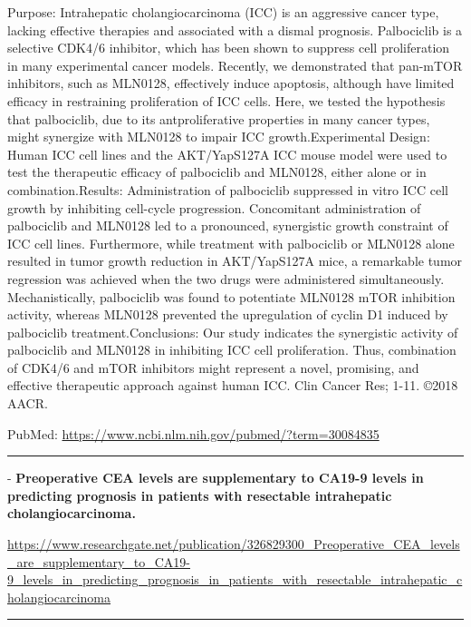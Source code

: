 \documentclass[]{article}
\begin{document}
Purpose: Intrahepatic cholangiocarcinoma (ICC) is an aggressive cancer
type, lacking effective therapies and associated with a dismal
prognosis. Palbociclib is a selective CDK4/6 inhibitor, which has been
shown to suppress cell proliferation in many experimental cancer models.
Recently, we demonstrated that pan-mTOR inhibitors, such as MLN0128,
effectively induce apoptosis, although have limited efficacy in
restraining proliferation of ICC cells. Here, we tested the hypothesis
that palbociclib, due to its antproliferative properties in many cancer
types, might synergize with MLN0128 to impair ICC growth.Experimental
Design: Human ICC cell lines and the AKT/YapS127A ICC mouse model were
used to test the therapeutic efficacy of palbociclib and MLN0128, either
alone or in combination.Results: Administration of palbociclib
suppressed in vitro ICC cell growth by inhibiting cell-cycle
progression. Concomitant administration of palbociclib and MLN0128 led
to a pronounced, synergistic growth constraint of ICC cell lines.
Furthermore, while treatment with palbociclib or MLN0128 alone resulted
in tumor growth reduction in AKT/YapS127A mice, a remarkable tumor
regression was achieved when the two drugs were administered
simultaneously. Mechanistically, palbociclib was found to potentiate
MLN0128 mTOR inhibition activity, whereas MLN0128 prevented the
upregulation of cyclin D1 induced by palbociclib treatment.Conclusions:
Our study indicates the synergistic activity of palbociclib and MLN0128
in inhibiting ICC cell proliferation. Thus, combination of CDK4/6 and
mTOR inhibitors might represent a novel, promising, and effective
therapeutic approach against human ICC. Clin Cancer Res; 1-11. ©2018
AACR.

PubMed: \url{https://www.ncbi.nlm.nih.gov/pubmed/?term=30084835}

{}

{}

\begin{center}\rule{0.5\linewidth}{\linethickness}\end{center}

 - \textbf{Preoperative CEA levels are supplementary to CA19-9 levels in
predicting prognosis in patients with resectable intrahepatic
cholangiocarcinoma.}

\url{https://www.researchgate.net/publication/326829300_Preoperative_CEA_levels_are_supplementary_to_CA19-9_levels_in_predicting_prognosis_in_patients_with_resectable_intrahepatic_cholangiocarcinoma}

\begin{center}\rule{0.5\linewidth}{\linethickness}\end{center}
\end{document}
